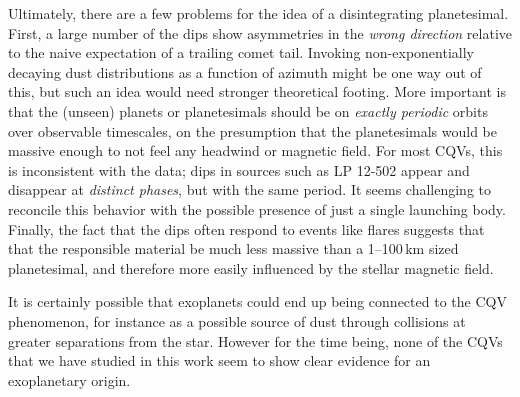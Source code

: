 \documentclass[11pt,twocolumn,tighten]{aastex63}
\begin{document}

Ultimately, there are a few problems for the idea of a disintegrating
planetesimal.  First, a large number of the dips show asymmetries in
the {\it wrong direction} relative to the naive expectation of a
trailing comet tail.  Invoking non-exponentially decaying dust
distributions as a function of azimuth might be one way out of this,
but such an idea would need stronger theoretical footing.  More
important is that the (unseen) planets or planetesimals should be on
{\it exactly periodic} orbits over observable timescales, on the
presumption that the planetesimals would be massive enough to not feel
any headwind or magnetic field.  For most CQVs, this is inconsistent
with the data; dips in sources such as LP 12-502 appear and disappear
at {\it distinct phases}, but with the same period.  It seems
challenging to reconcile this behavior with the possible presence of
just a single launching body.  Finally, the fact that the dips often
respond to events like flares suggests that that the responsible
material be much less massive than a 1--100\,km sized planetesimal,
and therefore more easily influenced by the stellar magnetic field.

It is certainly possible that exoplanets could end up being connected
to the CQV phenomenon, for instance as a possible source of dust
through collisions at greater separations from the star.  However for
the time being, none of the CQVs that we have studied in this work
seem to show clear evidence for an exoplanetary origin.




\end{document}
